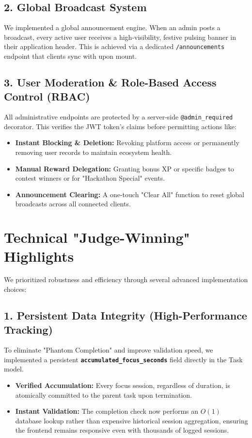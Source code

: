 \documentclass[12pt,a4paper]{article}
\begin{document}
\subsection{2. Global Broadcast System}
We implemented a global announcement engine. When an admin posts a broadcast, every active user receives a high-visibility, festive pulsing banner in their application header. This is achieved via a dedicated \texttt{/announcements} endpoint that clients sync with upon mount.

\subsection{3. User Moderation \& Role-Based Access Control (RBAC)}
All administrative endpoints are protected by a server-side \texttt{@admin\_required} decorator. This verifies the JWT token's claims before permitting actions like:
\begin{itemize}
    \item \textbf{Instant Blocking \& Deletion:} Revoking platform access or permanently removing user records to maintain ecosystem health.
    \item \textbf{Manual Reward Delegation:} Granting bonus XP or specific badges to contest winners or for "Hackathon Special" events.
    \item \textbf{Announcement Clearing:} A one-touch "Clear All" function to reset global broadcasts across all connected clients.
\end{itemize}

\section{Technical "Judge-Winning" Highlights}
We prioritized robustness and efficiency through several advanced implementation choices:

\subsection{1. Persistent Data Integrity (High-Performance Tracking)}
To eliminate "Phantom Completion" and improve validation speed, we implemented a persistent \textbf{\texttt{accumulated\_focus\_seconds}} field directly in the Task model. 
\begin{itemize}
    \item \textbf{Verified Accumulation:} Every focus session, regardless of duration, is atomically committed to the parent task upon termination.
    \item \textbf{Instant Validation:} The completion check now performs an $O(1)$ database lookup rather than expensive historical session aggregation, ensuring the frontend remains responsive even with thousands of logged sessions.
\end{itemize}
\end{document}
